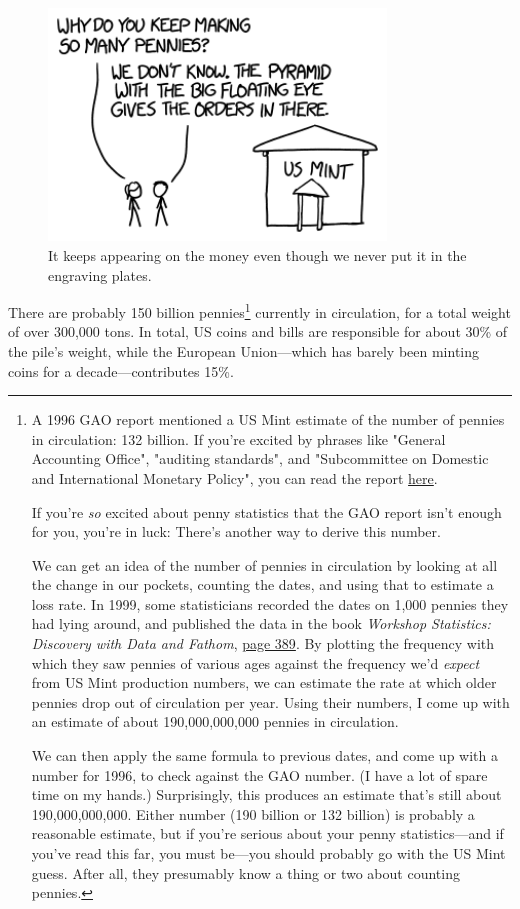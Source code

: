 {\begin{figure}[!htbp]
\centering
\includegraphics[scale=0.5, max width=0.8\textwidth]{imgs/a/111/mint.png}
\caption{It keeps appearing on the money even though we never put it in the engraving plates.}
\end{figure}

{There are probably 150 billion pennies{\footnote{A 1996 GAO report mentioned a US Mint estimate of the number of pennies in circulation: 132 billion. If you're excited by phrases like "General Accounting Office", "auditing standards", and "Subcommittee on Domestic and International Monetary Policy", you can read the report \href{http://gao.gov/assets/110/106568.pdf}{here}.

If you're \emph{so} excited about penny statistics that the GAO report isn't enough for you, you're in luck: There's another way to derive this number.

We can get an idea of the number of pennies in circulation by looking at all the change in our pockets, counting the dates, and using that to estimate a loss rate. In 1999, some statisticians recorded the dates on 1,000 pennies they had lying around, and published the data in the book \emph{Workshop Statistics: Discovery with Data and Fathom}, \href{http://books.google.com/books?id=wGMRja1vE0kC&lpg=PA389&pg=PA389\#v=onepage&q&f=false}{page 389}. By plotting the frequency with which they saw pennies of various ages against the frequency we'd \emph{expect} from US Mint production numbers, we can estimate the rate at which older pennies drop out of circulation per year. Using their numbers, I come up with an estimate of about 190,000,000,000 pennies in circulation.

We can then apply the same formula to previous dates, and come up with a number for 1996, to check against the GAO number. (I have a lot of spare time on my hands.) Surprisingly, this produces an estimate that's still about 190,000,000,000. Either number (190 billion or 132 billion) is probably a reasonable estimate, but if you're serious about your penny statistics—and if you've read this far, you must be—you should probably go with the US Mint guess. After all, they presumably know a thing or two about counting pennies.} } currently in circulation, for a total weight of over 300,000 tons. In total, US coins and bills are responsible for about 30\% of the pile's weight, while the European Union—which has barely been minting coins for a decade—contributes 15\%.}

}
